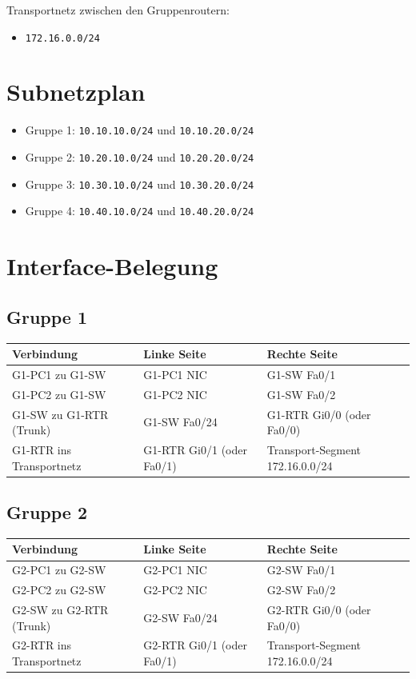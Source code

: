\documentclass[11pt, oneside, numbers=noenddot]{scrbook}
\begin{document}
Transportnetz zwischen den Gruppenroutern:
\begin{itemize}
\item \texttt{172.16.0.0/24}
\end{itemize}

\section{Subnetzplan}
\begin{itemize}
\item Gruppe 1: \texttt{10.10.10.0/24} und \texttt{10.10.20.0/24}
\item Gruppe 2: \texttt{10.20.10.0/24} und \texttt{10.20.20.0/24}
\item Gruppe 3: \texttt{10.30.10.0/24} und \texttt{10.30.20.0/24}
\item Gruppe 4: \texttt{10.40.10.0/24} und \texttt{10.40.20.0/24}
\end{itemize}

\section{Interface-Belegung}
\subsection{Gruppe 1}
\begin{longtable}{|l|l|l|}
\hline
Verbindung & Linke Seite & Rechte Seite \\
\hline
G1-PC1 zu G1-SW & G1-PC1 NIC & G1-SW Fa0/1 \\
\hline
G1-PC2 zu G1-SW & G1-PC2 NIC & G1-SW Fa0/2 \\
\hline
G1-SW zu G1-RTR (Trunk) & G1-SW Fa0/24 & G1-RTR Gi0/0 (oder Fa0/0) \\
\hline
G1-RTR ins Transportnetz & G1-RTR Gi0/1 (oder Fa0/1) & Transport-Segment 172.16.0.0/24 \\
\hline
\end{longtable}

\subsection{Gruppe 2}
\begin{longtable}{|l|l|l|}
\hline
Verbindung & Linke Seite & Rechte Seite \\
\hline
G2-PC1 zu G2-SW & G2-PC1 NIC & G2-SW Fa0/1 \\
\hline
G2-PC2 zu G2-SW & G2-PC2 NIC & G2-SW Fa0/2 \\
\hline
G2-SW zu G2-RTR (Trunk) & G2-SW Fa0/24 & G2-RTR Gi0/0 (oder Fa0/0) \\
\hline
G2-RTR ins Transportnetz & G2-RTR Gi0/1 (oder Fa0/1) & Transport-Segment 172.16.0.0/24 \\
\hline
\end{longtable}
\end{document}
